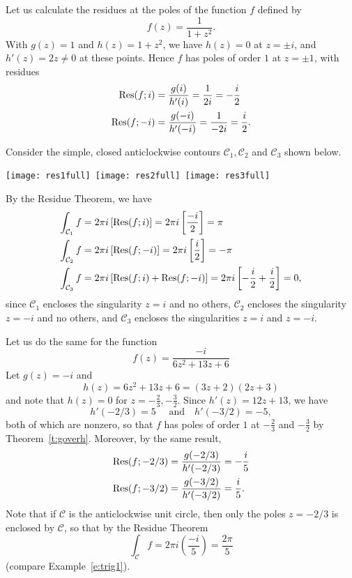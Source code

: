 \begin{comment}
A particularly helpful consequence of Theorem~\ref{t:gh} is as follows: if
\[
f(z) = \frac{g(z)}{z-z_0}
\]
for some function $g$ with $g(z_0) \neq 0$ and $g$ and $g$ holomorphic at $z_0$ (i.e., holomorphic on an open disc containing $z_0$), then
\[
\Res (f;z_0) = g(z_0).
\]
\end{comment}
\begin{example}
Let us calculate the residues at the poles of the function $f$ defined by
\[
f(z) = \frac{1}{1+z^2}.
\]
With $g(z)=1$ and $h(z)=1+z^2$, we have $h(z)=0$ at $z=\pm i$, and $h'(z)=2z \neq 0$ at these points.
Hence $f$ has poles of order $1$ at $z=\pm 1$, with residues
\begin{align*}
\mathrm{Res} (f;i ) & = \frac{g(i)}{h'(i)} = \frac{1}{2i} = - \frac{i}{2} \\
\mathrm{Res} (f;-i) & = \frac{g(-i)}{h'(-i)} = \frac{1}{-2i} = \frac{i}{2}.
\end{align*}

Consider the simple, closed anticlockwise contours $\mathcal{C}_1,\mathcal{C}_2$ and $\mathcal{C}_3$ shown below.
\begin{center}
\hspace*{-2.5cm}\texttt{[image: res1full]}\ \texttt{[image: res2full]}\ \texttt{[image: res3full]}
\end{center}
By the Residue Theorem, we have
\begin{align*}
\int_{\mathcal{C}_1} f &= 2\pi i \left[ \mathrm{Res} (f;i) \right] = 2\pi i \left[ \frac{-i}{2} \right] = \pi \\
\int_{\mathcal{C}_2} f &= 2\pi i \left[ \mathrm{Res} (f;-i) \right] =2\pi i \left[ \frac{i}{2} \right] = -\pi\\
\int_{\mathcal{C}_3} f &= 2\pi i \left[ \mathrm{Res} (f;i)+\mathrm{Res}(f;-i) \right] = 2\pi i \left[ -\frac{i}{2} + \frac{i}{2} \right] = 0,
\end{align*}
since $\mathcal{C}_1$ encloses the singularity $z=i$ and no others, $\mathcal{C}_2$ encloses the singularity $z=-i$ and no others, and $\mathcal{C}_3$ encloses the singularities $z=i$ and $z=-i$.
\end{example}
\begin{example}
Let us do the same for the function
\[
f(z) = \frac{-i}{6z^2+13z+6}
\]
Let $g(z)=-i$ and 
\[
h(z) = 6z^2+13z+6 = (3z+2)(2z+3)
\]
and note that $h(z)=0$ for $z=-\frac{2}{3},-\frac{3}{2}$.  Since $h'(z)=12z+13$, we have
\[
h'(-2/3)  = 5 \quad\text{ and}\quad h'(-3/2) = -5,
\]
both of which are nonzero, so that $f$ has poles of order $1$ at $-\frac{2}{3}$ and $-\frac{3}{2}$ by Theorem~\ref{t:goverh}.  Moreover, by the same result,
\begin{align*}
\mathrm{Res}(f;-2/3) & = \frac{g(-2/3)}{h'(-2/3)} = - \frac{i}{5} \\
\mathrm{Res} (f;-3/2) & = \frac{g(-3/2)}{h'(-3/2)} = \frac{i}{5}.
\end{align*}
Note that if $\mathcal{C}$ is the anticlockwise unit circle, then only the poles $z=-2/3$ is enclosed by $\mathcal{C}$, so that by the Residue Theorem
\[
\int_{\mathcal{C}} f = 2\pi i \left( \frac{-i}{5} \right) = \frac{2\pi}{5}
\]
(compare Example~\ref{e:trig1}).
\end{example}
